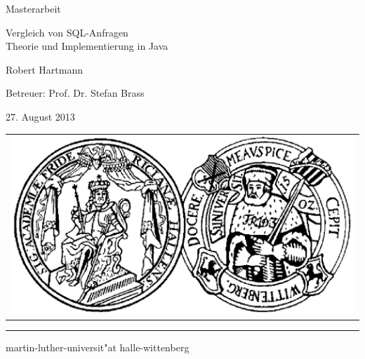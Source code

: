 \pagestyle{empty}

\begin{center}

{\Large\sc Masterarbeit}

\vspace{1.25cm}

{\fontsize{22}{22}\selectfont Vergleich von SQL-Anfragen\\Theorie und Implementierung in Java}

\vspace{1.25cm}

{\Large\sc

Robert Hartmann

\vspace{.15cm}

Betreuer: Prof. Dr. Stefan Brass

\vspace{.15cm}

27. August 2013

}

\vspace{10.5cm}

\begin{tabular}{c}
	\includegraphics[height=15ex]{Bilder/siegel}
\end{tabular}

\vspace{0.5cm}

\rule{.7\textwidth}{.40pt}

\vspace{.2cm}

{\large\sc

martin-luther-universit"at halle-wittenberg

}

\end{center}

\cleardoublepage


